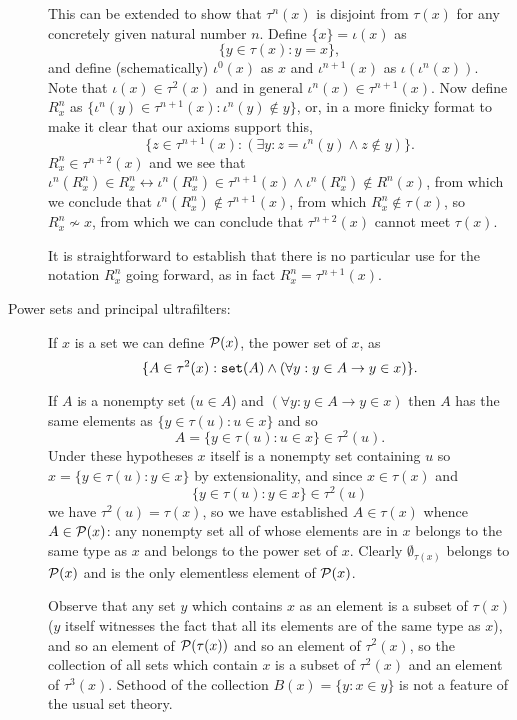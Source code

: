 \documentclass[12pt]{article}
\begin{document}
\begin{description}
This can be extended to show that $\tau^n(x)$ is disjoint from $\tau(x)$ for any concretely given natural number $n$.
Define $\{x\} = \iota(x)$ as $$\{y \in \tau(x):y=x\},$$ and define (schematically) $\iota^0(x)$ as $x$ and $\iota^{n+1}(x)$ as $\iota(\iota^n(x))$.  Note that $\iota(x) \in \tau^2(x)$ and in general $\iota^n(x) \in \tau^{n+1}(x)$.  Now define $R^n_x$ as $\{\iota^n(y) \in \tau^{n+1}(x):\iota^n(y) \not\in y\}$, or, in a more finicky format to make it clear that our axioms support this,  $$\{z\in \tau^{n+1}(x):(\exists y: z=\iota^n(y)\wedge z \not\in y)\}.$$ $R^n_x \in \tau^{n+2}(x)$
and we see that $\iota^n(R^n_x) \in R^n_x \leftrightarrow \iota^n(R^n_x) \in \tau^{n+1}(x) \wedge \iota^n(R^n_x) \not\in R^n(x)$, from which we conclude that $\iota^n(R^n_x) \not\in \tau^{n+1}(x)$, from which $R^n_x \not\in \tau(x)$, so $R^n_x \not\sim x$, from which we can conclude that $\tau^{n+2}(x)$ cannot meet $\tau(x)$.

It is straightforward to establish that there is no particular use for the notation $R^n_x$ going forward, as in fact $R^n_x = \tau^{n+1}(x)$.

\item[Power sets and principal ultrafilters:]    If $x$ is a set we can define ${\cal P}(x)$, the power set of $x$, as $$\{A \in \tau^2(x):{\tt set}(A) \wedge (\forall y:y \in A \rightarrow y \in x)\}.$$  

If $A$ is a nonempty set ($u \in A$) and $(\forall y:y \in A \rightarrow y \in x)$ then $A$ has the same elements as
$\{y \in \tau(u):u \in x\}$ and so $$A = \{y \in \tau(u):u \in x\} \in \tau^2(u).$$ Under these hypotheses $x$ itself is a nonempty
set containing $u$ so $x = \{y \in \tau(u):y \in x\}$ by extensionality, and since $x \in \tau(x)$ and  $$\{y \in \tau(u):y \in x\}\in \tau^2(u)$$ we have $\tau^2(u)=\tau(x)$, so we have established $A \in \tau(x)$ whence $A \in {\cal P}(x)$:  any nonempty set all of whose elements are in $x$ belongs to the same type as $x$ and belongs to the power set of $x$.
Clearly $\emptyset_{\tau(x)}$ belongs to ${\cal P}(x)$ and is the only elementless element of ${\cal P}(x)$.

Observe that any set $y$ which contains $x$ as an element  is a subset of $\tau(x)$ ($y$ itself witnesses the fact that all its elements
are of the same type as $x$), and so an element of ${\cal P}(\tau(x))$ and so an element of $\tau^2(x)$, so the collection of all sets which contain $x$ is a subset of $\tau^2(x)$ and an element of $\tau^3(x)$.  Sethood of the collection $B(x) = \{y:x \in y\}$ is not a feature of the usual set theory.


\end{description}
\end{document}
